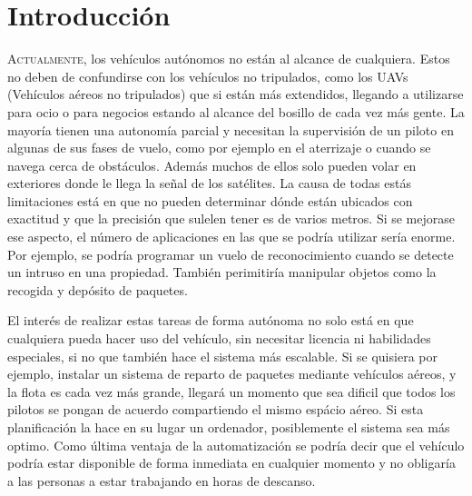 \chapter{Introducción}\label{chp-02}




\lettrine[lraise=-0.1, lines=2, loversize=0.2]{A}{ctualmente}, los vehículos autónomos no están al alcance de cualquiera. Estos no deben de confundirse con los vehículos no tripulados, como los UAVs (Vehículos aéreos no tripulados) que si están más extendidos, llegando a utilizarse para ocio o para negocios estando al alcance del bosillo de cada vez más gente. La mayoría tienen una autonomía parcial y necesitan la supervisión de un piloto en algunas de sus fases de vuelo, como por ejemplo en el aterrizaje o cuando se navega cerca de obstáculos. Además muchos de ellos solo pueden volar en exteriores donde le llega la señal de los satélites. 
La causa de todas estás limitaciones está en que no pueden determinar dónde están ubicados con exactitud y que la precisión que sulelen tener es de varios metros. Si se mejorase ese aspecto, el número de aplicaciones en las que se podría utilizar sería enorme. 
Por ejemplo, se podría programar un vuelo de reconocimiento cuando se detecte un intruso en una propiedad. También perimitiría manipular objetos como la recogida y depósito de paquetes.  

El interés de realizar estas tareas de forma autónoma no solo está en que cualquiera pueda hacer uso del vehículo, sin necesitar licencia ni habilidades especiales, si no que también hace el sistema más escalable. Si se quisiera por ejemplo, instalar un sistema de reparto de paquetes mediante vehículos aéreos, y la flota es cada vez más grande, llegará un momento que sea dificil que todos los pilotos se pongan de acuerdo compartiendo el mismo espácio aéreo. Si esta planificación la hace en su lugar un ordenador, posiblemente el sistema sea más optimo. Como última ventaja de la automatización se podría decir que el vehículo podría estar disponible de forma inmediata en cualquier momento y no obligaría a las personas a estar trabajando en horas de descanso. 

